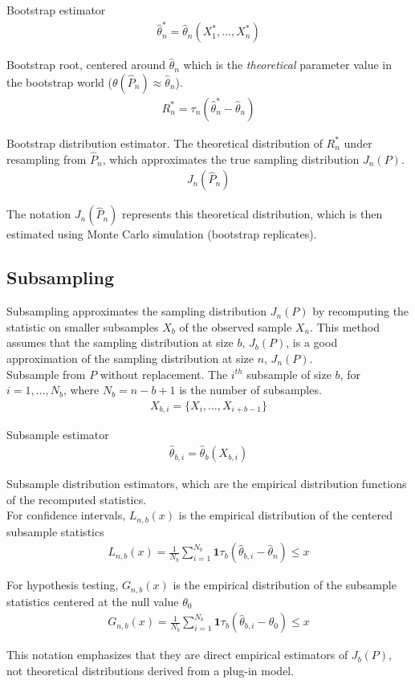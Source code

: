 \documentclass[9pt]{article}
\begin{document}
Bootstrap estimator
\begin{align}
    \hat\theta^*_n = \hat\theta_n(X^*_1,\dots,X^*_n)
\end{align}

Bootstrap root, centered around $\hat\theta_n$ which is the \textit{theoretical} parameter value in the bootstrap world ($\theta(\hat{P}_n) \approx \hat{\theta}_n$).
\begin{align}
    R^*_n = \tau_n(\hat\theta^*_n - \hat\theta_n)
\end{align}

Bootstrap distribution estimator. The theoretical distribution of $R_n^*$ under resampling from $\hat{P}_n$, which approximates the true sampling distribution $J_n(P)$. 
\begin{align}
    J_n(\hat{P}_n)
\end{align}

The notation $J_n(\hat P_n)$ represents this theoretical distribution, which is then estimated using Monte Carlo simulation (bootstrap replicates).

\subsection*{Subsampling}

Subsampling approximates the sampling distribution $J_n(P)$ by recomputing the statistic on smaller subsamples $X_b$ of the observed sample $X_n$. This method assumes that the sampling distribution at size $b$, $J_b(P)$, is a good approximation of the sampling distribution at size $n$, $J_n(P)$.\\

Subsample from $P$ without replacement. The $i^{th}$ subsample of size $b$, for $i=1, \dots, N_b$, where $N_b = n-b+1$ is the number of subsamples.
\begin{align}
    X_{b,i} = \{X_i, \dots, X_{i+b-1}\}
\end{align}

Subsample estimator
\begin{align}
    \hat\theta_{b,i} = \hat\theta_b(X_{b,i})
\end{align}

Subsample distribution estimators, which are the empirical distribution functions of the recomputed statistics.\\

For confidence intervals, $L_{n,b}(x)$ is the empirical distribution of the centered subsample statistics
\begin{align}
L_{n,b}(x) = \frac{1}{N_b} \sum_{i=1}^{N_b} \mathbf{1}{\tau_b(\hat{\theta}_{b,i} - \hat{\theta}_n) \le x}
\end{align}

For hypothesis testing, $G_{n,b}(x)$ is the empirical distribution of the subsample statistics centered at the null value $\theta_0$
\begin{align}
G_{n,b}(x) = \frac{1}{N_b} \sum_{i=1}^{N_b} \mathbf{1}{\tau_b(\hat{\theta}_{b,i} - \theta_0) \le x}
\end{align}

This notation emphasizes that they are direct empirical estimators of $J_b(P)$, not theoretical distributions derived from a plug-in model.
\end{document}
